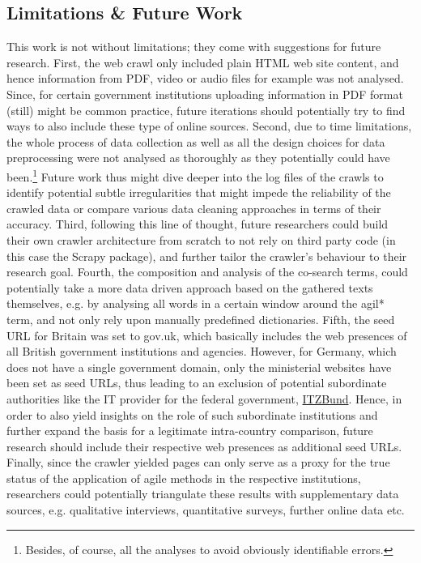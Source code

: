 \subsection{Limitations \& Future Work}\label{Limitations and Future Work}
This work is not without limitations; they come with suggestions for future research. First, the web crawl only included plain HTML web site content, and hence information from PDF, video or audio files for example was not analysed. Since, for certain government institutions uploading information in PDF format (still) might be common practice, future iterations should potentially try to find ways to also include these type of online sources. Second, due to time limitations, the whole process of data collection as well as all the design choices for data preprocessing were not analysed as thoroughly as they potentially could have been.\footnote{Besides, of course, all the analyses to avoid obviously identifiable errors.} Future work thus might dive deeper into the log files of the crawls to identify potential subtle irregularities that might impede the reliability of the crawled data or compare various data cleaning approaches in terms of their accuracy. Third, following this line of thought, future researchers could build their own crawler architecture from scratch to not rely on third party code (in this case the Scrapy package), and further tailor the crawler's behaviour to their research goal. Fourth, the composition and analysis of the co-search terms, could potentially take a more data driven approach based on the gathered texts themselves, e.g. by analysing all words in a certain window around the agil* term, and not only rely upon manually predefined dictionaries. Fifth, the seed URL for Britain was set to gov.uk, which basically includes the web presences of all British government institutions and agencies. However, for Germany, which does not have a single government domain, only the ministerial websites have been set as seed URLs, thus leading to an exclusion of potential subordinate authorities like the IT provider for the federal government, \href{https://www.itzbund.de/DE/Home/home_node.html}{ITZBund}. Hence, in order to also yield insights on the role of such subordinate institutions and further expand the basis for a legitimate intra-country comparison, future research should include their respective web presences as additional seed URLs. Finally, since the crawler yielded pages can only serve as a proxy for the true status of the application of agile methods in the respective institutions, researchers could potentially triangulate these results with supplementary data sources, e.g. qualitative interviews, quantitative surveys, further online data etc. 


